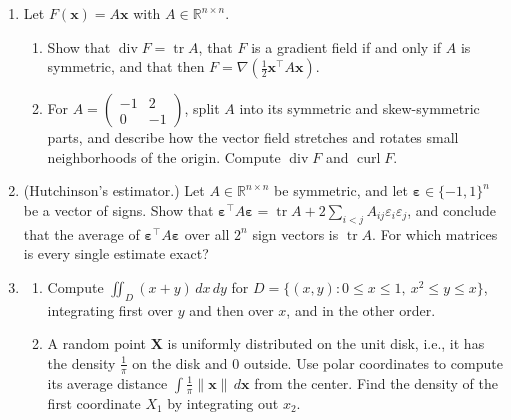 \documentclass[11pt]{article}
\newcommand{\norm}[1]{\lVert #1 \rVert}
\theoremstyle{definition}
\theoremstyle{plain}
\theoremstyle{remark}
\DeclareMathOperator{\tr}{tr}
\DeclareMathOperator{\Div}{div}
\DeclareMathOperator{\curl}{curl}
\begin{document}
\begin{enumerate}[leftmargin=*]
\begin{enumerate}[label=(\alph*)]
        \item Show that $\Div(gF) = g\Div F + \nabla g^\top F$ and $\Delta(fg) = g\Delta f + 2\nabla f^\top\nabla g + f\Delta g$.
        \item Show that $\Delta\log\norm{\mathbf{x}} = 0$ on $\mathbb{R}^2 \setminus \{\mathbf{0}\}$, and that $\Delta\norm{\mathbf{x}}^{2-n} = 0$ on $\mathbb{R}^n \setminus \{\mathbf{0}\}$ for $n \geq 3$. (Hint: $\nabla\norm{\mathbf{x}} = \frac{\mathbf{x}}{\norm{\mathbf{x}}}$, and use (b).)
    \end{enumerate}
    \item Let $F(\mathbf{x}) = A\mathbf{x}$ with $A \in \mathbb{R}^{n \times n}$.
    \begin{enumerate}[label=(\alph*)]
        \item Show that $\Div F = \tr A$, that $F$ is a gradient field if and only if $A$ is symmetric, and that then $F = \nabla(\frac{1}{2}\mathbf{x}^\top A\mathbf{x})$.
        \item For $A = \begin{pmatrix} -1 & 2 \\ 0 & -1 \end{pmatrix}$, split $A$ into its symmetric and skew-symmetric parts, and describe how the vector field stretches and rotates small neighborhoods of the origin. Compute $\Div F$ and $\curl F$.
    \end{enumerate}
    \item\label{ex3:hutchinson} (Hutchinson's estimator.) Let $A \in \mathbb{R}^{n \times n}$ be symmetric, and let $\boldsymbol{\varepsilon} \in \{-1, 1\}^n$ be a vector of signs. Show that $\boldsymbol{\varepsilon}^\top A\boldsymbol{\varepsilon} = \tr A + 2\sum_{i < j} A_{ij}\varepsilon_i\varepsilon_j$, and conclude that the average of $\boldsymbol{\varepsilon}^\top A\boldsymbol{\varepsilon}$ over all $2^n$ sign vectors is $\tr A$. For which matrices is every single estimate exact?
    \item \begin{enumerate}[label=(\alph*)]
        \item Compute $\iint_D (x + y)\, dx\, dy$ for $D = \{(x, y) : 0 \leq x \leq 1, \ x^2 \leq y \leq x\}$, integrating first over $y$ and then over $x$, and in the other order.
        \item A random point $\mathbf{X}$ is uniformly distributed on the unit disk, i.e., it has the density $\frac{1}{\pi}$ on the disk and $0$ outside. Use polar coordinates to compute its average distance $\int \frac{1}{\pi}\norm{\mathbf{x}}\, d\mathbf{x}$ from the center. Find the density of the first coordinate $X_1$ by integrating out $x_2$.

\end{enumerate}
\end{enumerate}
\end{document}
